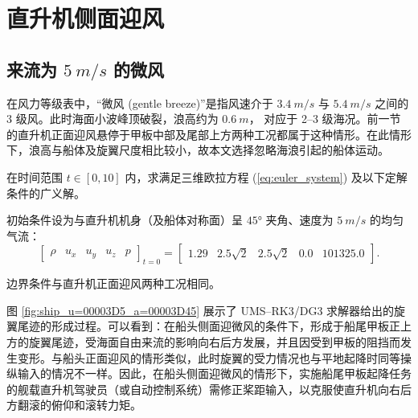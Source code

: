\section{直升机侧面迎风}

\subsection{来流为 $\SI{5}{m/s}$ 的微风}

在风力等级表中，“微风 (gentle breeze)”是指风速介于 $\SI{3.4}{m/s}$ 与 $\SI{5.4}{m/s}$
之间的 3 级风。此时海面小波峰顶破裂，浪高约为 $\SI{0.6}{m}$， 对应于 2–3 级海况。前一节的直升机正面迎风悬停于甲板中部及尾部上方两种工况都属于这种情形。在此情形下，浪高与船体及旋翼尺度相比较小，故本文选择忽略海浪引起的船体运动。
\begin{problem}
[直升机侧面迎微风悬停于甲板中部上方]\label{prob:=0076F4=005347=00673A=004FA7=009762=008FCE=005FAE=0098CE=0060AC=00505C=004E8E=007532=00677F=004E2D=0090E8=004E0A=0065B9}在时间范围
$t\in[0,10]$ 内，求满足三维欧拉方程 (\ref{eq:euler_system}) 及以下定解条件的广义解。

初始条件设为与直升机机身（及船体对称面）呈 $\ang{45}$ 夹角、速度为 $\SI{5}{m/s}$ 的均匀气流：
\begin{equation}
\begin{bmatrix}\rho & u_{x} & u_{y} & u_{z} & p\end{bmatrix}_{t=0}=\begin{bmatrix}1.29 & 2.5\sqrt{2} & 2.5\sqrt{2} & 0.0 & 101325.0\end{bmatrix}.
\end{equation}

边界条件与直升机正面迎风两种工况相同。
\end{problem}

图 \ref{fig:ship_u=00003D5_a=00003D45} 展示了 UMS–RK3/DG3 求解器给出的旋翼尾迹的形成过程。可以看到：在船头侧面迎微风的条件下，形成于船尾甲板正上方的旋翼尾迹，受海面自由来流的影响向右后方发展，并且因受到甲板的阻挡而发生变形。与船头正面迎风的情形类似，此时旋翼的受力情况也与平地起降时同等操纵输入的情况不一样。因此，在船头侧面迎微风的情形下，实施船尾甲板起降任务的舰载直升机驾驶员（或自动控制系统）需修正桨距输入，以克服使直升机向右后方翻滚的俯仰和滚转力矩。

